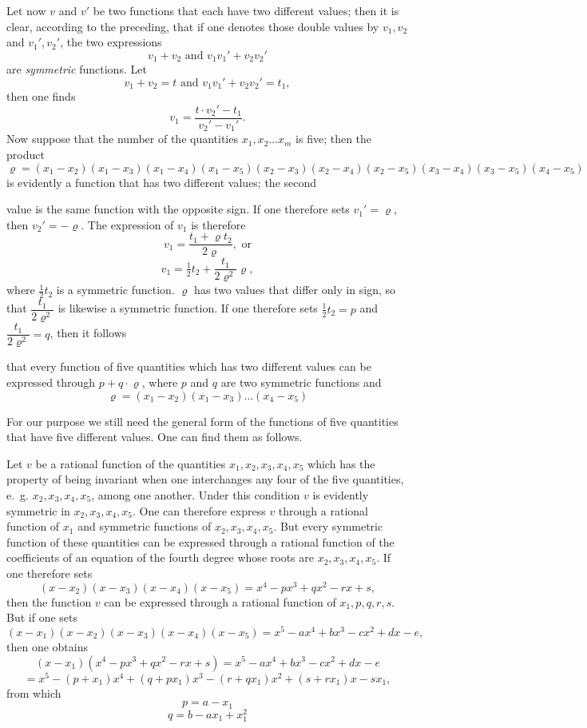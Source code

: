 \documentclass{article}
\begin{document}
Let now $v$ and $v'$ be two functions that each have two different values; then it is clear, according to the preceding, that if one denotes those double values by $v_1, v_2$ and $v_1', v_2'$, the two expressions
\[ v_1 + v_2 \text{ and } v_1 v_1' + v_2 v_2' \]
are \emph{symmetric} functions. Let
\[ v_1 + v_2 = t \text{ and } v_1 v_1' + v_2 v_2' = t_1, \]
then one finds
\[ v_1 = \frac{t \cdot v_2' - t_1}{v_2' - v_1'}. \]
Now suppose that the number of the quantities $x_1, x_2 \ldots x_m$ is five; then the product
\[ \varrho = (x_1 - x_2)(x_1 - x_3)(x_1 - x_4)(x_1 - x_5)(x_2 - x_3)(x_2 - x_4)(x_2 - x_5)(x_3 - x_4)(x_3 - x_5)(x_4 - x_5) \]
is evidently a function that has two different values; the second

value is the same function with the opposite sign. If one therefore sets $v_1' = \varrho$, then $v_2' = -\varrho$. The expression of $v_1$ is therefore
\[ v_1 = \frac{t_1 + \varrho t_2}{2\varrho}, \text{ or} \]
\[ v_1 = \tfrac{1}{2} t_2 + \frac{t_1}{2\varrho^{2}} \varrho, \]
where $\tfrac{1}{2} t_2$ is a symmetric function. $\varrho$ has two values that differ only in sign, so that $\dfrac{t_1}{2\varrho^{2}}$ is likewise a symmetric function. If one therefore sets $\tfrac{1}{2} t_2 = p$ and $\dfrac{t_1}{2\varrho^{2}} = q$, then it follows

that every function of five quantities which has two different values can be expressed through $p + q \cdot \varrho$, where $p$ and $q$ are two symmetric functions and
\[ \varrho = (x_1 - x_2)(x_1 - x_3) \ldots (x_4 - x_5) \]

For our purpose we still need the general form of the functions of five quantities that have five different values. One can find them as follows.

Let $v$ be a rational function of the quantities $x_1, x_2, x_3, x_4, x_5$ which has the property of being invariant when one interchanges any four of the five quantities, e.\ g. $x_2, x_3, x_4, x_5$, among one another. Under this condition $v$ is evidently symmetric in $x_2, x_3, x_4, x_5$. One can therefore express $v$ through a rational function of $x_1$ and symmetric functions of $x_2, x_3, x_4, x_5$. But every symmetric function of these quantities can be expressed through a rational function of the coefficients of an equation of the fourth degree whose roots are $x_2, x_3, x_4, x_5$. If one therefore sets
\[ (x - x_2)(x - x_3)(x - x_4)(x - x_5) = x^{4} - px^{3} + qx^{2} - rx + s, \]
then the function $v$ can be expressed through a rational function of $x_1, p, q, r, s$. But if one sets
\[ (x - x_1)(x - x_2)(x - x_3)(x - x_4)(x - x_5) = x^{5} - ax^{4} + bx^{3} - cx^{2} + dx - e, \]
then one obtains
\[ (x - x_1)(x^{4} - px^{3} + qx^{2} - rx + s) = x^{5} - ax^{4} + bx^{3} - cx^{2} + dx - e \]
\[ = x^{5} - (p + x_1)x^{4} + (q + px_1)x^{3} - (r + qx_1)x^{2} + (s + rx_1)x - sx_1, \]
from which
\[ p = a - x_1 \]
\[ q = b - ax_1 + x_1^{2} \]
\end{document}

